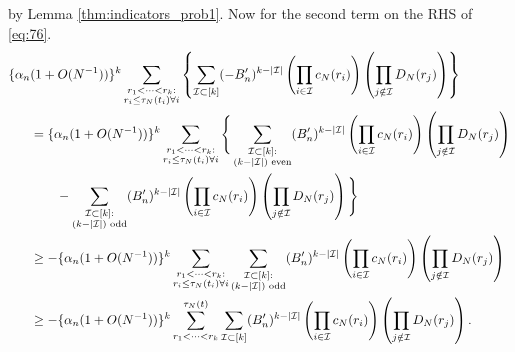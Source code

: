 \documentclass{article}
\newcommand{\1}[1]{\mathbbm{1}_{#1}}
\begin{document}
by Lemma \ref{thm:indicators_prob1}.
Now for the second term on the RHS of \eqref{eq:76}.
\begin{align}
\{ \alpha_n &(1 + O(N^{-1}) ) \}^k \sum_{\substack{r_1 <\dots< r_k :\\ r_i \leq \tau_N(t_i) \forall i}}
\left\{ \sum_{\mathcal{I} \subset [k]} (-B_n^\prime)^{k-|\mathcal{I}|}
\left( \prod_{i\in\mathcal{I}} c_N(r_i) \right)
\left( \prod_{j\notin\mathcal{I}} D_N(r_j) \right)
\right\} \notag\\
&= \{ \alpha_n (1 + O(N^{-1}) ) \}^k
\sum_{\substack{r_1 <\dots< r_k :\\ r_i \leq \tau_N(t_i) \forall i}}
\Bigg\{ \sum_{\substack{\mathcal{I} \subset [k]: \\ (k-|\mathcal{I}|) \text{ even} }} (B_n^\prime)^{k-|\mathcal{I}|}
\left( \prod_{i\in\mathcal{I}} c_N(r_i) \right)
\left( \prod_{j\notin\mathcal{I}} D_N(r_j) \right) \notag\\
&\qquad- \sum_{\substack{\mathcal{I} \subset [k]: \\ (k-|\mathcal{I}|) \text{ odd} }} (B_n^\prime)^{k-|\mathcal{I}|}
\left( \prod_{i\in\mathcal{I}} c_N(r_i) \right)
\left( \prod_{j\notin\mathcal{I}} D_N(r_j) \right) \Bigg\} \notag\\
&\geq - \{ \alpha_n (1 + O(N^{-1}) ) \}^k
\sum_{\substack{r_1 <\dots< r_k :\\ r_i \leq \tau_N(t_i) \forall i}}
\sum_{\substack{\mathcal{I} \subset [k]: \\ (k-|\mathcal{I}|) \text{ odd} }} (B_n^\prime)^{k-|\mathcal{I}|}
\left( \prod_{i\in\mathcal{I}} c_N(r_i) \right)
\left( \prod_{j\notin\mathcal{I}} D_N(r_j) \right) \notag\\
&\geq - \{ \alpha_n (1 + O(N^{-1}) ) \}^k
\sum_{r_1 <\dots< r_k}^{\tau_N(t)}
\sum_{ \mathcal{I} \subset [k] } (B_n^\prime)^{k-|\mathcal{I}|}
\left( \prod_{i\in\mathcal{I}} c_N(r_i) \right)
\left( \prod_{j\notin\mathcal{I}} D_N(r_j) \right) . \label{eq:79a}
\end{align}
\end{document}
